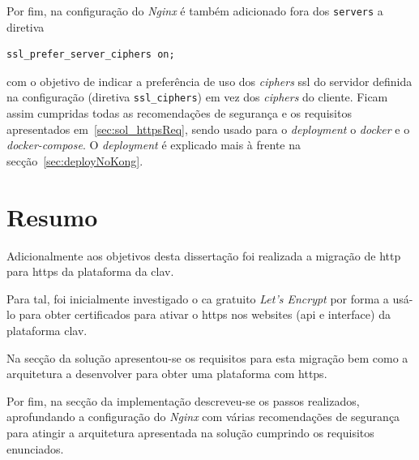 Por fim, na configuração do \textit{Nginx} é também adicionado fora dos \texttt{servers} a diretiva 
\begin{verbatim}
ssl_prefer_server_ciphers on;
\end{verbatim}
com o objetivo de indicar a preferência de uso dos \textit{ciphers} \acrshort{ssl} do servidor definida na configuração (diretiva \texttt{ssl\_ciphers}) em vez dos \textit{ciphers} do cliente. Ficam assim cumpridas todas as recomendações de segurança e os requisitos apresentados em~\ref{sec:sol_httpsReq}, sendo usado para o \textit{deployment} o \textit{docker} e o \textit{docker-compose}. O \textit{deployment} é explicado mais à frente na secção~\ref{sec:deployNoKong}.

\section{Resumo}

Adicionalmente aos objetivos desta dissertação foi realizada a migração de \acrshort{http} para \acrshort{https} da plataforma da \acrshort{clav}.

Para tal, foi inicialmente investigado o \acrfull{ca} gratuito \textit{Let's Encrypt} por forma a usá-lo para obter certificados para ativar o \acrshort{https} nos websites (\acrshort{api} e interface) da plataforma \acrshort{clav}.

Na secção da solução apresentou-se os requisitos para esta migração bem como a arquitetura a desenvolver para obter uma plataforma com \acrshort{https}. 

Por fim, na secção da implementação descreveu-se os passos realizados, aprofundando a configuração do \textit{Nginx} com várias recomendações de segurança para atingir a arquitetura apresentada na solução cumprindo os requisitos enunciados.
